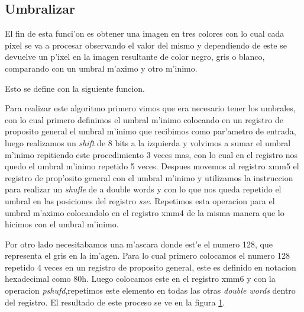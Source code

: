 \subsection{Umbralizar}
El fin de esta funci'on es obtener una imagen en tres colores con lo cual cada pixel se va a procesar observando el valor del 
mismo y dependiendo de este se devuelve un p'ixel en la imagen resultante de color negro, gris o blanco, 
comparando con un umbral m'aximo y otro m'inimo.

Esto se define con la siguiente funcion.

Para realizar este algoritmo primero vimos que era necesario tener los umbrales, con lo cual primero definimos el umbral 
m'inimo colocando en un registro de proposito general el umbral m'inimo que recibimos como par'ametro de entrada, 
luego realizamos un \textit{shift} de 8 bits a la izquierda y volvimos a sumar el umbral m'inimo repitiendo este procedimiento 3 veces mas, 
con lo cual en el registro nos quedo el umbral m'inimo repetido 5 veces.
Despues movemos al registro xmm5 el registro de prop'osito general con el umbral m'inimo y utilizamos la instruccion para 
realizar un \textit{shufle} de a double words y con lo que nos queda repetido el umbral en las posiciones del registro \textit{sse}. 
Repetimos esta operacion para el umbral m'aximo colocandolo en el registro xmm4 de la misma manera que lo hicimos con el umbral m'inimo.

Por otro lado necesitabamos una m'ascara donde est'e el numero 128, que representa el gris en la im'agen.
Para lo cual primero colocamos el numero 128 repetido 4 veces en un registro de proposito general,  
este es definido en notacion hexadecimal como 80h. Luego colocamos este en el registro xmm6 y con la operacion 
\textit{pshufd},repetimos este elemento en todas las otras \textit{double words} dentro del registro.
El resultado de este proceso se ve en la figura \ref{est:u-uno}.

\begin{figure}[ht]
\label{est:u-uno}
\end{figure}

